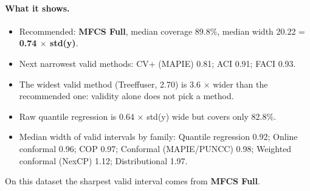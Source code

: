 \documentclass[11pt]{article}
\begin{document}
\paragraph{What it shows.}
\begin{itemize}
\item Recommended: \textbf{MFCS Full}, median coverage 89.8\%, median width 20.22 = \textbf{0.74 $\times$ std(y)}.
\item Next narrowest valid methods: CV+ (MAPIE) 0.81; ACI 0.91; FACI 0.93.
\item The widest valid method (Treeffuser, 2.70) is 3.6 $\times$ wider than the recommended one: validity alone does not pick a method.
\item Raw quantile regression is 0.64 $\times$ std(y) wide but covers only 82.8\%.
\item Median width of valid intervals by family: Quantile regression 0.92; Online conformal 0.96; COP 0.97; Conformal (MAPIE/PUNCC) 0.98; Weighted conformal (NexCP) 1.12; Distributional 1.97.
\end{itemize}
\begin{insight}[Takeaway RQ5]
On this dataset the sharpest valid interval comes from \textbf{MFCS Full}.
\end{insight}
\end{document}
